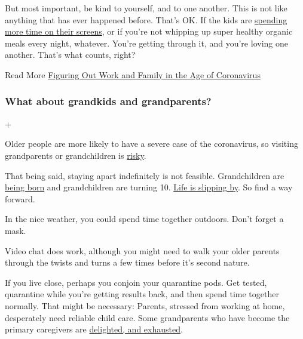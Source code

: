 But most important, be kind to yourself, and to one another. This is not
like anything that has ever happened before. That's OK. If the kids are
\href{https://www.nytimes3xbfgragh.onion/2020/04/13/parenting/manage-screen-time-coronavirus.html}{spending
more time on their screens}, or if you're not whipping up super healthy
organic meals every night, whatever. You're getting through it, and
you're loving one another. That's what counts, right?

Read More
\href{https://www.nytimes3xbfgragh.onion/2020/03/19/us/work-from-home-mothers-coronavirus-covid19.html}{Figuring
Out Work and Family in the Age of Coronavirus}

\hypertarget{what-about-grandkids-and-grandparents}{%
\subsubsection{What about grandkids and
grandparents?}\label{what-about-grandkids-and-grandparents}}

+

Older people are more likely to have a severe case of the coronavirus,
so visiting grandparents or grandchildren is
\href{https://www.nytimes3xbfgragh.onion/2020/03/20/parenting/grandparents-visit-safety-coronavirus.html}{risky}.

That being said, staying apart indefinitely is not feasible.
Grandchildren are
\href{https://www.nytimes3xbfgragh.onion/2020/06/16/parenting/baby/grandparents-meet-newborn-coronavirus.html}{being
born} and grandchildren are turning 10.
\href{https://www.nytimes3xbfgragh.onion/2020/04/29/well/family/coronavirus-grandchildren-compromised-immunity-cancer.html}{Life
is slipping by}. So find a way forward.

In the nice weather, you could spend time together outdoors. Don't
forget a mask.

Video chat does work, although you might need to walk your older parents
through the twists and turns a few times before it's second nature.

If you live close, perhaps you conjoin your quarantine pods. Get tested,
quarantine while you're getting results back, and then spend time
together normally. That might be necessary: Parents, stressed from
working at home, desperately need reliable child care. Some grandparents
who have become the primary caregivers are
\href{https://www.nytimes3xbfgragh.onion/2020/05/12/parenting/coronavirus-grandparents-childcare.html?type=roundup\&link=intro}{delighted,
and exhausted}.


